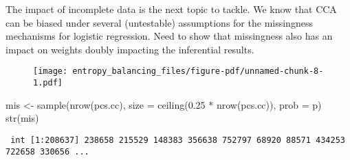\documentclass[
  letterpaper,
  DIV=11,
  numbers=noendperiod]{scrartcl}
\newenvironment{Shaded}{\begin{snugshade}}{\end{snugshade}}
\newcommand{\AttributeTok}[1]{\textcolor[rgb]{0.40,0.45,0.13}{#1}}
\newcommand{\DecValTok}[1]{\textcolor[rgb]{0.68,0.00,0.00}{#1}}
\newcommand{\FloatTok}[1]{\textcolor[rgb]{0.68,0.00,0.00}{#1}}
\newcommand{\FunctionTok}[1]{\textcolor[rgb]{0.28,0.35,0.67}{#1}}
\newcommand{\NormalTok}[1]{\textcolor[rgb]{0.00,0.23,0.31}{#1}}
\newcommand{\OtherTok}[1]{\textcolor[rgb]{0.00,0.23,0.31}{#1}}
\newcommand{\SpecialCharTok}[1]{\textcolor[rgb]{0.37,0.37,0.37}{#1}}
\begin{document}
The impact of incomplete data is the next topic to tackle. We know that
CCA can be biased under several (untestable) assumptions for the
missingness mechanisms for logistic regression. Need to show that
missingness also has an impact on weights doubly impacting the
inferential results.

\begin{Shaded}
\end{Shaded}

\begin{figure}[H]

{\centering \texttt{[image: entropy\_balancing\_files/figure-pdf/unnamed-chunk-8-1.pdf]}

}

\end{figure}

\begin{Shaded}
\begin{Highlighting}[]
\NormalTok{mis }\OtherTok{\textless{}{-}} \FunctionTok{sample}\NormalTok{(}\FunctionTok{nrow}\NormalTok{(pcs.cc), }\AttributeTok{size =} \FunctionTok{ceiling}\NormalTok{(}\FloatTok{0.25} \SpecialCharTok{*} \FunctionTok{nrow}\NormalTok{(pcs.cc)), }\AttributeTok{prob =}\NormalTok{ p)}
\FunctionTok{str}\NormalTok{(mis)}
\end{Highlighting}
\end{Shaded}

\begin{verbatim}
 int [1:208637] 238658 215529 148383 356638 752797 68920 88571 434253 722658 330656 ...
\end{verbatim}
\end{document}
